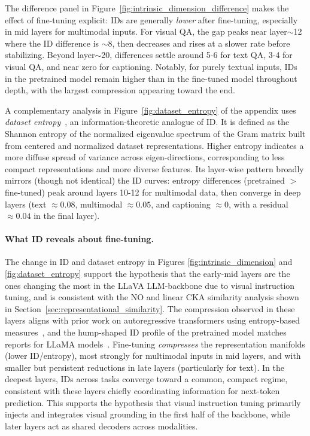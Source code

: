 The difference panel in Figure~\ref{fig:intrinsic_dimension_difference} makes the effect of fine-tuning explicit: IDs are generally \emph{lower} after fine-tuning, especially in mid layers for multimodal inputs. For visual QA, the gap peaks near layer$\sim$12 where the ID difference is $\sim$8, then decreases and rises at a slower rate before stabilizing. Beyond layer$\sim$20, differences settle around 5-6 for text QA, 3-4 for visual QA, and near zero for captioning. Notably, for purely textual inputs, IDs in the pretrained model remain higher than in the fine-tuned model throughout depth, with the largest compression appearing toward the end.

A complementary analysis in Figure~\ref{fig:dataset_entropy} of the appendix uses \emph{dataset entropy}~\cite{skeanLayerLayerUncovering2025}, an information-theoretic analogue of ID. It is defined as the Shannon entropy of the normalized eigenvalue spectrum of the Gram matrix built from centered and normalized dataset representations. Higher entropy indicates a more diffuse spread of variance across eigen-directions, corresponding to less compact representations and more diverse features. Its layer-wise pattern broadly mirrors (though not identical) the ID curves: entropy differences (pretrained $>$ fine-tuned) peak around layers 10-12 for multimodal data, then converge in deep layers (text $\approx 0.08$, multimodal $\approx 0.05$, and captioning $\approx 0$, with a residual $\approx 0.04$ in the final layer).

\paragraph{What ID reveals about fine-tuning.}
The change in ID and dataset entropy in Figures \ref{fig:intrinsic_dimension} and \ref{fig:dataset_entropy} support the hypothesis that the early-mid layers are the ones changing the most in the LLaVA LLM-backbone due to visual instruction tuning, and is consistent with the NO and linear CKA similarity analysis shown in Section~\ref{sec:representational_similarity}. The compression observed in these layers aligns with prior work on autoregressive transformers using entropy-based measures~\cite{skeanLayerLayerUncovering2025}, and the hump-shaped ID profile of the pretrained model matches reports for LLaMA models~\cite{doimoRepresentationLandscapeFewShot}. Fine-tuning \emph{compresses} the representation manifolds (lower ID/entropy), most strongly for multimodal inputs in mid layers, and with smaller but persistent reductions in late layers (particularly for text). In the deepest layers, IDs across tasks converge toward a common, compact regime, consistent with these layers chiefly coordinating information for next-token prediction. This supports the hypothesis that visual instruction tuning primarily injects and integrates visual grounding in the first half of the backbone, while later layers act as shared decoders across modalities.

